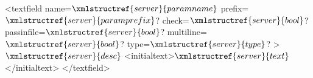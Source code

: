 <textfield name=$\xmlstructref{server}{paramname}$ prefix=$\xmlstructref{server}{paramprefix}$? check=$\xmlstructref{server}{bool}$? 
         passinfile=$\xmlstructref{server}{bool}$? multiline=$\xmlstructref{server}{bool}$? type=$\xmlstructref{server}{type}$? >
  $\xmlstructref{server}{desc}$
  <initialtext>$\xmlstructref{server}{text}$</initialtext>
</textfield>
